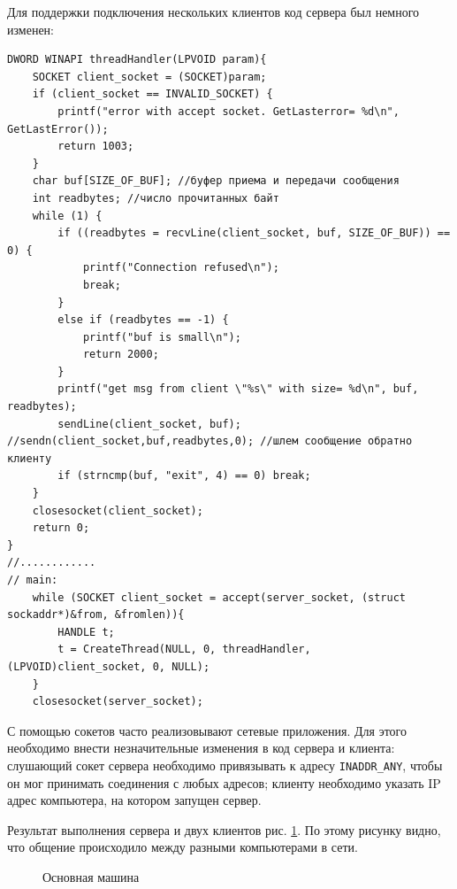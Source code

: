 \documentclass[a4paper]{article}
\begin{document}
	Для поддержки подключения нескольких клиентов код сервера был немного изменен:
	\begin{lstlisting}[style=crs_cpp]
DWORD WINAPI threadHandler(LPVOID param){
	SOCKET client_socket = (SOCKET)param;
	if (client_socket == INVALID_SOCKET) {
		printf("error with accept socket. GetLasterror= %d\n", GetLastError());
		return 1003;
	}
	char buf[SIZE_OF_BUF]; //буфер приема и передачи сообщения 
	int readbytes; //число прочитанных байт 
	while (1) {
		if ((readbytes = recvLine(client_socket, buf, SIZE_OF_BUF)) == 0) {
			printf("Connection refused\n");
			break;
		}
		else if (readbytes == -1) {
			printf("buf is small\n");
			return 2000;
		}
		printf("get msg from client \"%s\" with size= %d\n", buf, readbytes);
		sendLine(client_socket, buf); //sendn(client_socket,buf,readbytes,0); //шлем сообщение обратно клиенту
		if (strncmp(buf, "exit", 4) == 0) break;
	}
	closesocket(client_socket);
	return 0;
}
//............
// main:
	while (SOCKET client_socket = accept(server_socket, (struct sockaddr*)&from, &fromlen)){
		HANDLE t;
		t = CreateThread(NULL, 0, threadHandler, (LPVOID)client_socket, 0, NULL);
	}
	closesocket(server_socket);
	\end{lstlisting}
	
	С помощью сокетов часто реализовывают сетевые приложения. Для этого необходимо внести незначительные изменения в код сервера и клиента: слушающий сокет сервера необходимо привязывать к адресу \texttt{INADDR\_ANY}, чтобы он мог принимать соединения с любых адресов; клиенту необходимо указать IP адрес компьютера, на котором запущен сервер.
	
	Результат выполнения сервера и двух клиентов рис. \ref{img:task6_2}. По этому рисунку видно, что общение происходило между разными компьютерами в сети.
	\begin{figure}[h!]
		\caption{Основная машина}
		\label{img:task6_2}
	\end{figure}	
	
\end{document}
